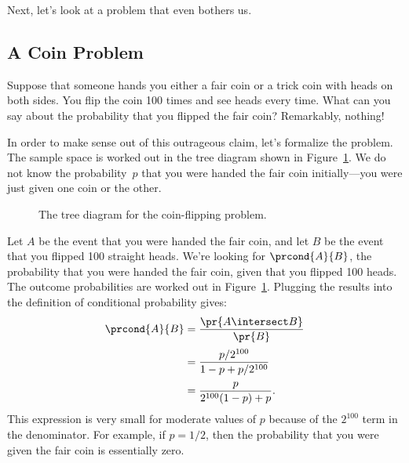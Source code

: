 Next, let's look at a problem that even bothers us.


\begin{problems}
\practiceproblems
{}

\classproblems
{}

\homeworkproblems
{}
\end{problems}

\subsection{A Coin Problem}

Suppose that someone hands you either a fair coin or a trick coin with
heads on both sides.  You flip the coin 100 times and see heads every
time.  What can you say about the probability that you flipped the
fair coin?  Remarkably, nothing!

In order to make sense out of this outrageous claim, let's formalize
the problem.  The sample space is worked out in the tree diagram shown
in Figure~\ref{fig:15C2}.  We do not know the probability~$p$ that you
were handed the fair coin initially---you were just given one coin or
the other.
%
\begin{figure}[h]



\caption{The tree diagram for the coin-flipping problem.}

\label{fig:15C2}

\end{figure}
%
Let $A$ be the event that you were handed the fair coin, and let $B$
be the event that you flipped 100 straight heads.  We're looking
for $\prcond{A}{B}$, the probability that you were handed the fair
coin, given that you flipped 100 heads.  The outcome probabilities are
worked out in Figure~\ref{fig:15C2}.  Plugging the results into the
definition of conditional probability gives:
%
\begin{align*}
\prcond{A}{B}	& = \frac{\pr{A \intersect B}}{\pr{B}} \\[2pt]
		& = \frac{p / 2^{100}}{1 - p + p / 2^{100}} \\[2pt]
		& = \frac{p}{2^{100} (1 - p) + p}.
\end{align*}
%
This expression is very small for moderate values of $p$ because of
the $2^{100}$ term in the denominator.  For example, if $p = 1/2$,
then the probability that you were given the fair coin is essentially
zero.

